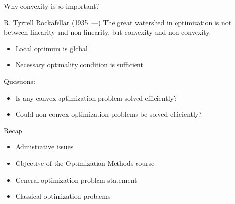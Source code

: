 \documentclass[12pt]{beamer}
\begin{document}
\begin{frame}{Why convexity is so important?}
\begin{block}{R. Tyrrell Rockafellar (1935~---)}
The great watershed in optimization is not between linearity and
non-linearity, but convexity and non-convexity.
\end{block}
\begin{itemize}
\item Local optimum is global
\item Necessary optimality condition is sufficient
\end{itemize}
Questions:
\begin{itemize}
\item Is any convex optimization problem solved efficiently?
\item Could non-convex optimization problems be solved efficiently?
\end{itemize}
\end{frame}

\begin{frame}{Recap}
\begin{itemize}
\item Admistrative issues
\item Objective of the Optimization Methods course
\item General optimization problem statement
\item Classical optimization problems
\end{itemize}
\end{frame}
\end{document}
